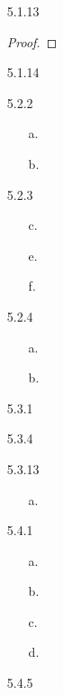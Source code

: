 \documentclass[11pt]{amsart}
\theoremstyle{definition}
\begin{document}
\begin{itemize}
\item[5.1.13] \begin{proof}
	
\end{proof}

\item[5.1.14]

\item[5.2.2]
\begin{itemize}
    \item[a.]

    \item[b.]

\end{itemize}

\item[5.2.3]
\begin{itemize}
    \item[c.]

    \item[e.]

    \item[f.]
    
\end{itemize}

\item[5.2.4]
\begin{itemize}
    \item[a.]

    \item[b.]

\end{itemize}

\item[5.3.1]

\item[5.3.4]

\item[5.3.13]
\begin{itemize}
    \item[a.]

\end{itemize}

\item[5.4.1]
\begin{itemize}
    \item[a.]

    \item[b.]

    \item[c.]

    \item[d.]
    
\end{itemize}

\item[5.4.5]

\end{itemize}
\end{document}
